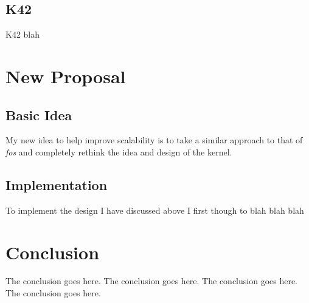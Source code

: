 \documentclass[journal]{IEEEtran}
\begin{document}
\subsection{K42}
K42 blah

\section{New Proposal}

\subsection{Basic Idea}
My new idea to help improve scalability is to take a similar approach to that of \emph{fos} \cite{fos} and completely rethink the idea and design of the kernel. 

\subsection{Implementation}

To implement the design I have discussed above I first though to blah blah blah

\section{Conclusion}
The conclusion goes here.
The conclusion goes here.
The conclusion goes here.
The conclusion goes here.




\end{document}
